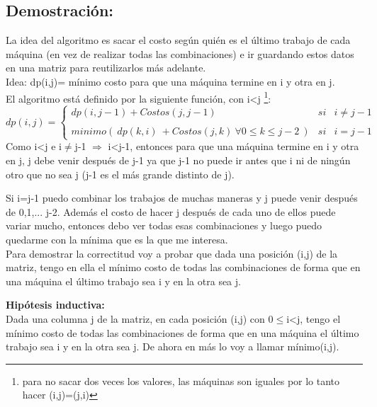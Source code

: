 \subsection{Demostración:}

La idea del algoritmo es sacar el costo según quién es el último trabajo de cada máquina (en vez de realizar todas las combinaciones) e ir guardando estos datos en una matriz para reutilizarlos más adelante.\\

Idea: dp(i,j)= mínimo costo para que una máquina termine en i y otra en j.\\

El algoritmo está definido por la siguiente función, con i<j \footnote{para no sacar dos veces los valores, las máquinas son iguales por lo tanto hacer (i,j)=(j,i)}:\\

$dp(i,j)= \left\{ \begin{array}{lcc}
				dp(i,j-1) + Costos(j, j-1) & si & i \neq j-1\\
				\\ minimo(\ dp(k,i)\ + Costos(j, k)\ \forall 0\leq k\leq j-2\ ) & si & i=j-1
				\end{array}
		\right.$
\\

Como i<j e i$\neq$j-1 $\Rightarrow$ i<j-1, entonces para que una máquina termine en i y otra en j, j debe venir después de j-1 ya que j-1 no puede ir antes que i ni de ningún otro que no sea j (j-1 es el más grande distinto de j).

Si i=j-1 puedo combinar los trabajos de muchas maneras y j puede venir después de 0,1,... j-2. Además el costo de hacer j después de cada uno de ellos puede variar mucho, entonces debo ver todas esas combinaciones y luego puedo quedarme con la mínima que es la que me interesa.\\

Para demostrar la correctitud voy a probar que dada una posición (i,j) de la matriz, tengo en ella el mínimo costo de todas las combinaciones de forma que en una máquina el último trabajo sea i y en la otra sea j.

\textbf{Hipótesis inductiva:}\\
	Dada una columna j de la matriz, en cada posición (i,j) con 0$\leq$i<j, tengo el mínimo costo de todas las combinaciones de forma que en una máquina el último trabajo sea i y en la otra sea j. De ahora en más lo voy a llamar mínimo(i,j).\\
	

